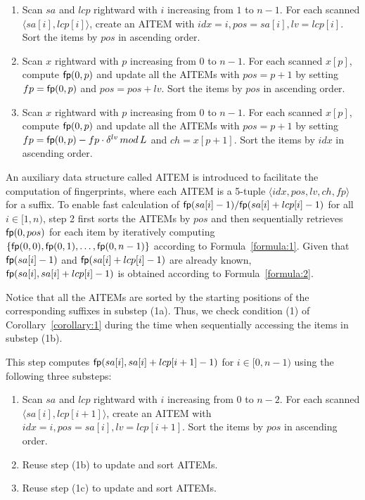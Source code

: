 \documentclass[10pt,journal,compsoc]{IEEEtran}
\begin{document}
	\begin{enumerate}
		
		\item [(1a)]
		Scan $sa$ and $lcp$ rightward with $i$ increasing from $1$ to $n - 1$. For each scanned $\langle sa[i], lcp[i] \rangle$, create an AITEM with $idx = i, pos = sa[i], lv = lcp[i]$. Sort the items by $pos$ in ascending order.
		
		\item [(1b)]
		Scan $x$ rightward with $p$ increasing from $0$ to $n - 1$. For each scanned $x[p]$, compute ${\sf fp}(0, p)$ and update all the AITEMs with $pos = p + 1$ by setting $fp = {\sf fp}(0, p)$ and $pos = pos + lv$. Sort the items by $pos$ in ascending order.
		
		\item [(1c)]
		Scan $x$ rightward with $p$ increasing from $0$ to $n - 1$. For each scanned $x[p]$, compute ${\sf fp}(0, p)$ and update all the AITEMs with $pos = p + 1$ by setting $fp = {\sf fp}(0, p) - fp \cdot {\delta}^{lv} \, mod \, L $ and $ch = x[p + 1]$. Sort the items by $idx$ in ascending order.
		
	\end{enumerate}
	
	An auxiliary data structure called AITEM is introduced to facilitate the computation of fingerprints, where each AITEM is a 5-tuple $\langle idx, pos, lv, ch, fp\rangle$ for a suffix. To enable fast calculation of ${\sf fp}(sa[i] - 1)/{\sf fp}(sa[i] + lcp[i] - 1)$ for all $i \in [1, n)$, step 2 first sorts the AITEMs by $pos$ and then sequentially retrieves ${\sf fp}(0, pos)$ for each item by iteratively computing $\{{\sf fp}(0, 0), {\sf fp}(0, 1), \dots, {\sf fp}(0, n - 1) \}$ according to Formula~\ref{formula:1}. Given that ${\sf fp}(sa[i] - 1)$ and ${\sf fp}(sa[i] + lcp[i] - 1)$ are already known, ${\sf fp}(sa[i], sa[i] + lcp[i] - 1)$ is obtained according to Formula~\ref{formula:2}.

	Notice that all the AITEMs are sorted by the starting positions of the corresponding suffixes in substep (1a). Thus, we check condition (1) of Corollary~\ref{corollary:1} during the time when sequentially accessing the items in substep (1b).
	
	\vspace{1ex}  This step computes ${\sf fp}(sa[i], sa[i] + lcp[i + 1] - 1)$ for $i \in [0, n - 1)$ using the following three substeps:
	
	\begin{enumerate}
		
		\item [(2a)]
		Scan $sa$ and $lcp$ rightward with $i$ increasing from $0$ to $n - 2$. For each scanned $\langle sa[i], lcp[i + 1] \rangle$, create an AITEM with $idx = i, pos = sa[i], lv = lcp[i + 1]$. Sort the items by $pos$ in ascending order.
		
		\item [(2b)]
		Reuse step (1b) to update and sort AITEMs.
		
		\item [(2c)]
		Reuse step (1c) to update and sort AITEMs.
		
	\end{enumerate}
	
\end{document}

